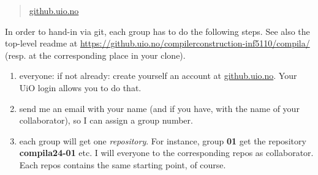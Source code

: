 \documentclass[10pt,freeform]{handout}[2014/08/13]
\begin{document}
\begin{quote}
  \url{github.uio.no}
\end{quote}


In order to hand-in via git, each group has to do the following steps. See
also the top-level readme at
\url{https://github.uio.no/compilerconstruction-inf5110/compila/} (resp. at
the corresponding place in your clone).

\begin{enumerate}
\item everyone: if not already: create yourself an account at
  \url{github.uio.no}. Your UiO login allows you to do that.
\item send me an email with your name (and if you have, with the name of
  your collaborator), so I can assign a group number.
\item each group will get one \emph{repository}. For instance, group
  \textbf{01} get the repository \textbf{compila24-01} etc.  I will
  everyone to the corresponding repos as collaborator. Each repos contains
  the same starting point, of course.
\end{enumerate}
\end{document}
